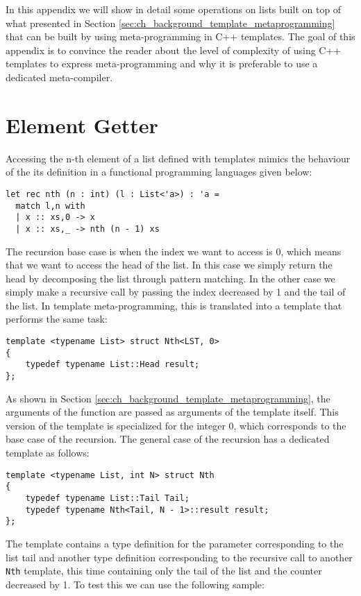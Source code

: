In this appendix we will show in detail some operations on lists built on top of what presented in Section \ref{sec:ch_background_template_metaprogramming} that can be built by using meta-programming in C++ templates. The goal of this appendix is to convince the reader about the level of complexity of using C++ templates to express meta-programming and why it is preferable to use a dedicated meta-compiler.

\section{Element Getter}
\label{sec:app_templates_getter}
Accessing the n-th element of a list defined with templates mimics the behaviour of the its definition in a functional programming languages given below:

\begin{lstlisting}
let rec nth (n : int) (l : List<'a>) : 'a =
  match l,n with
  | x :: xs,0 -> x
  | x :: xs,_ -> nth (n - 1) xs
\end{lstlisting}

\noindent
The recursion base case is when the index we want to access is 0, which means that we want to access the head of the list. In this case we simply return the head by decomposing the list through pattern matching. In the other case we simply make a recursive call by passing the index decreased by 1 and the tail of the list. In template meta-programming, this is translated into a template that performs the same task:

\begin{lstlisting}
template <typename List> struct Nth<LST, 0> 
{
    typedef typename List::Head result;
};
\end{lstlisting}

\noindent
As shown in Section \ref{sec:ch_background_template_metaprogramming}, the arguments of the function are passed as arguments of the template itself. This version of the template is specialized for the integer 0, which corresponds to the base case of the recursion. The general case of the recursion has a dedicated template as follows:

\begin{lstlisting}
template <typename List, int N> struct Nth 
{
    typedef typename List::Tail Tail;
    typedef typename Nth<Tail, N - 1>::result result;
};
\end{lstlisting}

\noindent
The template contains a type definition for the parameter corresponding to the list tail and another type definition corresponding to the recursive call to another \texttt{Nth} template, this time containing only the tail of the list and the counter decreased by 1. To test this we can use the following sample:

